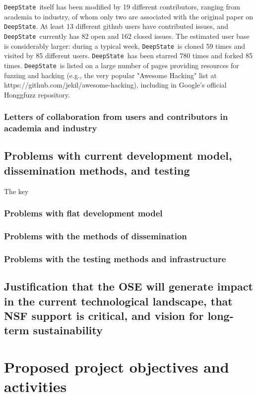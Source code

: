 \documentclass[numbers]{proposalnsf}
\newcommand{\ds}{\texttt{DeepState}}
\begin{document}
\ds\ itself has been modified by 19 different contributors, ranging from academia to industry, of whom only two are associated with the original paper on \ds. At least 13
 different github users have contributed issues, and \ds\ currently has 82 open and 162 closed issues.  The estimated user base is considerably larger:  during a typical week, \ds\ is cloned 59 times and visited by 85 different users.  \ds\ has been starred 780 times and forked 85 times.  \ds\ is listed on a large number of pages providing resources for fuzzing and hacking (e.g., the very popular "Awesome Hacking" list at https://github.com/jekil/awesome-hacking), including in Google's official Honggfuzz repository.

\subsubsection{Letters of collaboration from users and contributors in academia and industry}


\subsection{Problems with current development model, dissemination methods, and testing}

The key 

\subsubsection{Problems with flat development model}

\subsubsection{Problems with the methods of dissemination}

\subsubsection{Problems with the testing methods and infrastructure}

\subsection{Justification that the OSE will generate impact in the current technological landscape, that NSF support is critical, and vision for long-term sustainability}

\section{Proposed project objectives and activities}
\end{document}
